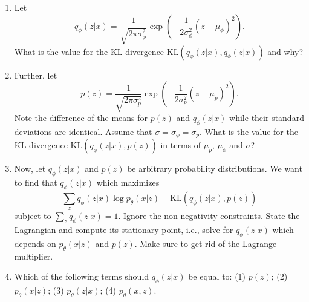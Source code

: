 \begin{Q}
\begin{enumerate}
\item Let
$$
q_{\phi}(z|x) = \frac{1}{\sqrt{2\pi\sigma_{\phi}^2}} \exp\left(-\frac{1}{2\sigma_{\phi}^2}(z - \mu_{\phi})^2\right).
$$
What is the value for the KL-divergence $\text{KL}(q_{\phi}(z|x), q_{\phi}(z|x))$ and why?
\item Further, let
 $$
 p(z) =  \frac{1}{\sqrt{2\pi\sigma_{p}^2}} \exp\left(-\frac{1}{2\sigma_{p}^{2}}(z - \mu_p)^2\right).
 $$
 Note the difference of the means for $p(z)$ and $q_{\phi}(z|x)$ while their standard deviations are identical. Assume that $\sigma=\sigma_{\phi}=\sigma_{p}$. What is the value for the KL-divergence $\text{KL}(q_{\phi}(z|x), p(z))$ in terms of $\mu_p$, $\mu_{\phi}$ and $\sigma$?

 \item Now, let $q_{\phi}(z|x)$ and $p(z)$ be  arbitrary probability distributions. We want to find that $q_{\phi}(z|x)$ which maximizes 
 $$
\sum_z q_{\phi}(z|x)\log p_\theta(x|z) - \text{KL}(q_{\phi}(z|x), p(z))	
 $$
subject to $\sum_z q_{\phi}(z|x) = 1$. Ignore the non-negativity constraints. State the Lagrangian and compute its stationary point, i.e., solve for $q_{\phi}(z|x)$ which depends on $p_\theta(x|z)$ and $p(z)$. Make sure to get rid of the Lagrange multiplier.
\item Which of the following terms should $q_{\phi}(z|x)$ be equal to: 
(1) $p(z)$; (2) $p_\theta(x|z)$; (3) $p_\theta(z|x)$; (4) $p_\theta(x, z)$.
\end{enumerate}
\end{Q}
          

            